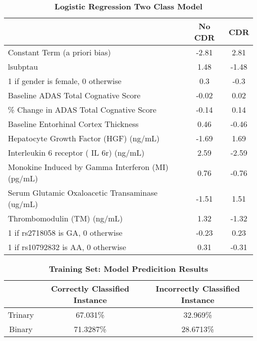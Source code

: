 \documentclass[10pt]{article}
\begin{document}
\begin{table}[!ht]
\caption{
\bf{Logistic Regression Two Class Model}}
\begin{tabular}{|l|c|c|}
\hline\hline %
 & No CDR &	CDR \\
\hline
Constant Term (a priori bias) &	-2.81 & 	2.81 \\
\hline
lsubptau &	1.48 & 	-1.48 \\
\hline
1 if gender is female, 0 otherwise &	0.3	 & -0.3 \\
\hline
Baseline ADAS Total Cognative Score &	-0.02 & 	0.02 \\
\hline
\% Change in ADAS Total Cognative Score &	-0.14 & 	0.14 \\
\hline
Baseline Entorhinal Cortex Thickness &	0.46 & 	-0.46 \\
\hline
Hepatocyte Growth Factor (HGF) (ng/mL) &	-1.69 & 	1.69 \\
\hline
Interleukin 6 receptor ( IL 6r) (ng/mL) &	2.59 & 	-2.59 \\
\hline
Monokine Induced by Gamma Interferon (MI) (pg/mL) &	0.76 & 	-0.76 \\
\hline
Serum Glutamic Oxaloacetic Transaminase (ug/mL) &	-1.51 & 	1.51 \\
\hline
Thrombomodulin (TM) (ng/mL) &	1.32 & 	-1.32 \\
\hline
1 if rs2718058 is GA, 0 otherwise &	-0.23 & 	0.23 \\
\hline
1 if rs10792832 is AA, 0 otherwise &	0.31	 & -0.31 \\
\hline
\end{tabular}
\begin{flushleft}
\end{flushleft}
\label{table:two_class_model} 
\end{table}


\begin{table}[!ht]
\caption{
\bf{Training Set: Model Predicition Results}}
\begin{tabular}{|c|c|c|}
\hline\hline %
& Correctly Classified Instance & Incorrectly Classified Instance \\
\hline
\hline
Trinary & 67.031\% & 32.969\% \\
\hline
Binary & 71.3287\% & 28.6713\% \\
\hline
\end{tabular}
\begin{flushleft}
\end{flushleft}
\label{table:training_results} 
\end{table}
\end{document}
